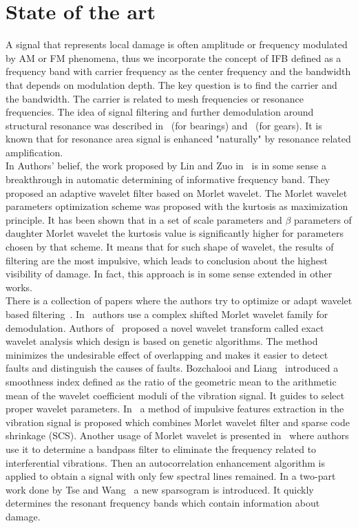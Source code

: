 \documentclass[3p,times]{elsarticle}
\begin{document}
\section{State of the art}\label{state}
A signal that represents local damage is often amplitude or frequency modulated by AM or FM phenomena, thus we incorporate the concept of IFB defined as a frequency band with carrier frequency as the center frequency and the bandwidth that depends on modulation depth. The key question is to find the carrier and the bandwidth. The carrier is related to mesh frequencies or resonance frequencies. The idea of signal filtering and further demodulation around structural resonance was  described in~\cite{bib13} (for bearings) and~\cite{bib39} (for gears). It is known that for resonance area signal is enhanced "naturally" by resonance related amplification.\\
In Authors' belief, the work proposed by Lin and Zuo in~\cite{bib40} is in some sense a breakthrough in automatic determining of informative frequency band. They proposed an adaptive wavelet filter based on Morlet wavelet. The Morlet wavelet parameters optimization scheme was proposed with the kurtosis as maximization principle. It has been shown that in a set of scale parameters and $\beta$ parameters of daughter Morlet wavelet the kurtosis value is significantly higher for parameters chosen by that scheme. It means that for such shape of wavelet, the results of filtering are the most impulsive, which leads to conclusion about the highest visibility of damage. In fact, this approach is in some sense extended in other works.\\
There is a collection of papers where the authors try to optimize or adapt wavelet based filtering~\cite{bib41,bib42,Bozchalooi,bib43,bib44,Tse2,bib45}. In~\cite{bib41} authors use a complex shifted Morlet wavelet family for demodulation. Authors of~\cite{bib42} proposed a novel wavelet transform called exact wavelet analysis which design is based on genetic algorithms. The method minimizes the undesirable effect of overlapping and makes it easier to detect faults and distinguish the causes of faults. Bozchalooi and Liang~\cite{Bozchalooi} introduced a smoothness index defined as the ratio of the geometric mean to the arithmetic mean of the wavelet coefficient moduli of the vibration signal. It guides to select proper wavelet parameters. In~\cite{bib43} a method of impulsive features extraction in the vibration signal is proposed which combines Morlet wavelet filter and sparse code shrinkage (SCS). Another usage of Morlet wavelet is presented in~\cite{bib44} where authors use it to determine a bandpass filter to eliminate the frequency related to interferential vibrations. Then an autocorrelation enhancement algorithm is applied to obtain a signal with only few spectral lines remained. In a two-part work done by Tse and Wang~\cite{Tse2,bib45} a new sparsogram is introduced. It quickly determines the resonant frequency bands which contain information about damage.\\
\end{document}
